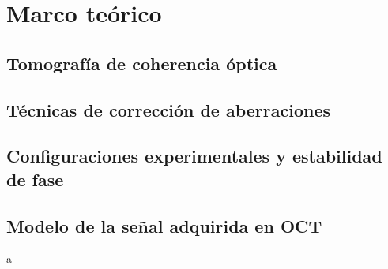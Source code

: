 \newpage
{}
\chapter{Marco teórico}

\section{Tomografía de coherencia óptica}

\section{Técnicas de corrección de aberraciones}

\section{Configuraciones experimentales y estabilidad de fase}

\section{Modelo de la señal adquirida en OCT}

a